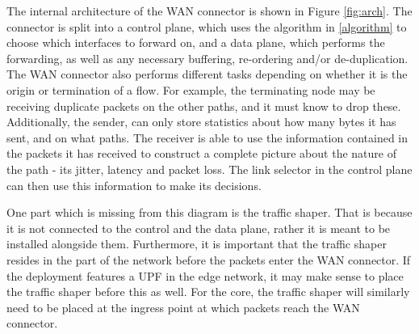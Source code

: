 The internal architecture of the WAN connector is shown in Figure \ref{fig:arch}. The connector is split into a control plane, which uses the algorithm in \ref{algorithm} to choose which interfaces to forward on, and a data plane, which performs the forwarding, as well as any necessary buffering, re-ordering and/or de-duplication. The WAN connector also performs different tasks depending on whether it is the origin or termination of a flow. For example, the terminating node may be receiving duplicate packets on the other paths, and it must know to drop these. Additionally, the sender, can only store statistics about how many bytes it has sent, and on what paths. The receiver is able to use the information contained in the packets it has received to construct a complete picture about the nature of the path - its jitter, latency and packet loss. The link selector in the control plane can then use this information to make its decisions.

One part which is missing from this diagram is the traffic shaper. That is because it is not connected to the control and the data plane, rather it is meant to be installed alongside them. Furthermore, it is important that the traffic shaper resides in the part of the network before the packets enter the WAN connector. If the deployment features a UPF in the edge network, it may make sense to place the traffic shaper before this as well. For the core, the traffic shaper will similarly need to be placed at the ingress point at which packets reach the WAN connector.































